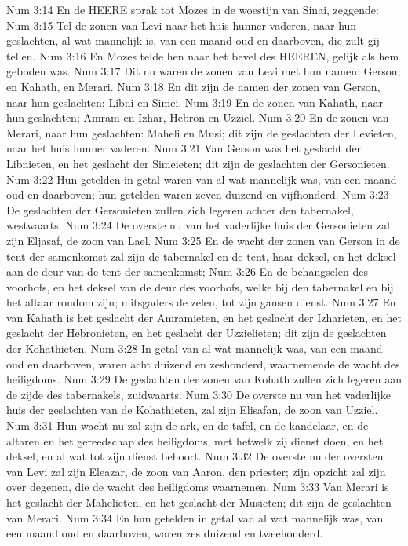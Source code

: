 Num 3:14  En de HEERE sprak tot Mozes in de woestijn van Sinai, zeggende:
Num 3:15  Tel de zonen van Levi naar het huis hunner vaderen, naar hun geslachten, al wat mannelijk is, van een maand oud en daarboven, die zult gij tellen.
Num 3:16  En Mozes telde hen naar het bevel des HEEREN, gelijk als hem geboden was.
Num 3:17  Dit nu waren de zonen van Levi met hun namen: Gerson, en Kahath, en Merari.
Num 3:18  En dit zijn de namen der zonen van Gerson, naar hun geslachten: Libni en Simei.
Num 3:19  En de zonen van Kahath, naar hun geslachten; Amram en Izhar, Hebron en Uzziel.
Num 3:20  En de zonen van Merari, naar hun geslachten: Maheli en Musi; dit zijn de geslachten der Levieten, naar het huis hunner vaderen.
Num 3:21  Van Gerson was het geslacht der Libnieten, en het geslacht der Simeieten; dit zijn de geslachten der Gersonieten.
Num 3:22  Hun getelden in getal waren van al wat mannelijk was, van een maand oud en daarboven; hun getelden waren zeven duizend en vijfhonderd.
Num 3:23  De geslachten der Gersonieten zullen zich legeren achter den tabernakel, westwaarts.
Num 3:24  De overste nu van het vaderlijke huis der Gersonieten zal zijn Eljasaf, de zoon van Lael.
Num 3:25  En de wacht der zonen van Gerson in de tent der samenkomst zal zijn de tabernakel en de tent, haar deksel, en het deksel aan de deur van de tent der samenkomst;
Num 3:26  En de behangselen des voorhofs, en het deksel van de deur des voorhofs, welke bij den tabernakel en bij het altaar rondom zijn; mitsgaders de zelen, tot zijn gansen dienst.
Num 3:27  En van Kahath is het geslacht der Amramieten, en het geslacht der Izharieten, en het geslacht der Hebronieten, en het geslacht der Uzzielieten; dit zijn de geslachten der Kohathieten.
Num 3:28  In getal van al wat mannelijk was, van een maand oud en daarboven, waren acht duizend en zeshonderd, waarnemende de wacht des heiligdoms.
Num 3:29  De geslachten der zonen van Kohath zullen zich legeren aan de zijde des tabernakels, zuidwaarts.
Num 3:30  De overste nu van het vaderlijke huis der geslachten van de Kohathieten, zal zijn Elisafan, de zoon van Uzziel.
Num 3:31  Hun wacht nu zal zijn de ark, en de tafel, en de kandelaar, en de altaren en het gereedschap des heiligdoms, met hetwelk zij dienst doen, en het deksel, en al wat tot zijn dienst behoort.
Num 3:32  De overste nu der oversten van Levi zal zijn Eleazar, de zoon van Aaron, den priester; zijn opzicht zal zijn over degenen, die de wacht des heiligdoms waarnemen.
Num 3:33  Van Merari is het geslacht der Mahelieten, en het geslacht der Musieten; dit zijn de geslachten van Merari.
Num 3:34  En hun getelden in getal van al wat mannelijk was, van een maand oud en daarboven, waren zes duizend en tweehonderd.
